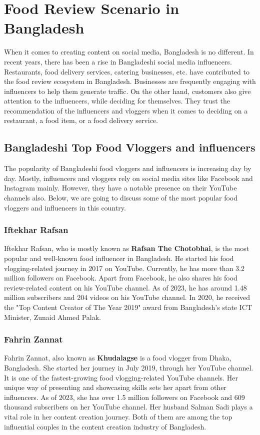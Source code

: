 \section{Food Review Scenario in Bangladesh}
When it comes to creating content on social media, Bangladesh is no different. In recent years, there has been a rise in Bangladeshi social media influencers. Restaurants, food delivery services, catering businesses, etc. have contributed to the food review ecosystem in Bangladesh. Businesses are frequently engaging with influencers to help them generate traffic. On the other hand, customers also give attention to the influencers, while deciding for themselves. They trust the recommendation of the influencers and vloggers when it comes to deciding on a restaurant, a food item, or a food delivery service.


\subsection{Bangladeshi Top Food Vloggers and influencers}
The popularity of Bangladeshi food vloggers and influencers is increasing day by day. Mostly, influencers and vloggers rely on social media sites like Facebook and Instagram mainly. However, they have a notable presence on their YouTube channels also. Below, we are going to discuss some of the most popular food vloggers and influencers in this country.

\subsubsection{Iftekhar Rafsan}
Iftekhar Rafsan, who is mostly known as \textbf{Rafsan The Chotobhai}, is the most popular and well-known food influencer in Bangladesh. He started his food vlogging-related journey in 2017 on YouTube. Currently, he has more than 3.2 million followers on Facebook. Apart from Facebook, he also shares his food review-related content on his YouTube channel. As of 2023, he has around 1.48 million subscribers and 204 videos on his YouTube channel. In 2020, he received the "Top Content Creator of The Year 2019" award from Bangladesh's state ICT Minister, Zunaid Ahmed Palak.\cite{hypescout}

\subsubsection{Fahrin Zannat}
Fahrin Zannat, also known as \textbf{Khudalagse} is a food vlogger from Dhaka, Bangladesh. She started her journey in July 2019, through her YouTube channel. It is one of the fastest-growing food vlogging-related YouTube channels. Her unique way of presenting and showcasing skills sets her apart from other influencers. As of 2023, she has over 1.5 million followers on Facebook and 609 thousand subscribers on her YouTube channel. Her husband Salman Sadi plays a vital role in her content creation journey. Both of them are among the top influential couples in the content creation industry of Bangladesh.

